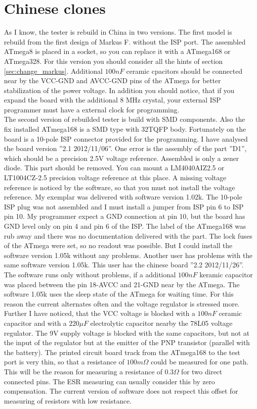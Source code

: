 \section{Chinese clones}
As I know, the tester is rebuild in China in two versions.
The first model is rebuild from the first design of Markus F. without the ISP port.
The assembled ATmega8 is placed in a socket, so you can replace it with a ATmega168 or ATmega328.
For this version you should consider all the hints of section \ref{sec:change_markus}.
Additional \(100nF\) ceramic cpacitors should be connected near by the VCC-GND and AVCC-GND pins of
the ATmega for better stabilization of the power voltage.
In addition you should notice, that if you expand the board with the additional 8 MHz crystal,
your external ISP programmer must have a external clock for programming.\\

The second version of rebuilded tester is build with SMD components. Also the fix installed ATmega168
is a SMD type with 32TQFP body.
Fortunately on the board is a 10-pole ISP connector provided for the programming.
I have analysed the board version ''2.1 2012/11/06''. One error is the assembly of the part ''D1'',
which should be a precision 2.5V voltage reference. Assembled is only a zener diode.
This part should be removed. You can mount a LM4040AIZ2.5 or LT1004CZ-2.5 precision voltage reference
at this place. A missing voltage reference is noticed by the software, so that you must not install
the voltage reference.
My exemplar was delivered with software version 1.02k. The 10-pole ISP plug was not assembled and I must
install a jumper from ISP pin 6 to ISP pin 10. My programmer expect a GND connection at pin 10, but the
board has GND level only on pin 4 and pin 6 of the ISP.
The label of the ATmega168 was rub away and there was no documentation delivered with the part.
The lock fuses of the ATmega were set, so no readout was possible.
But I could install the software version 1.05k without any problems.
Another user has problems with the same software version 1.05k. This user has the chinese board ''2.2 2012/11/26''.
The software runs only without problems, if a additional \(100nF\) keramic capacitor was placed between
the pin 18-AVCC and 21-GND near by the ATmega.
The software 1.05k uses the sleep state of the ATmega for waiting time. For this reason the current alternates
often and the voltage regulator is stressed more.
Further I have noticed, that the VCC voltage is blocked with a \(100nF\) ceramic capacitor and with a
\(220\mu F\) electrolytic capacitor nearby the 78L05 voltage regulator.
The 9V supply voltage is blocked with the same capacitors, but not at the input of the regulator but
at the emitter of the PNP transistor (parallel with the battery). 
The printed circuit board track from the ATmega168 to the test port is very thin, so that a resistance
of \(100m \Omega\) could be measured for one path. This will be the reason for measuring a resistance
of \(0.3 \Omega\) for two direct connected pins.
The ESR measuring can usually consider this by zero compensation.
The current version of software does not respect this offset for measuring of resistors with low resistance.


